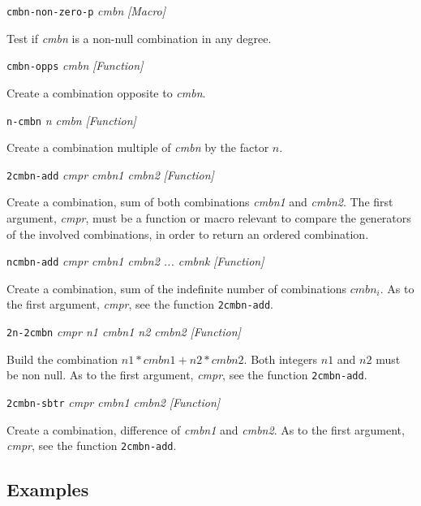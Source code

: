 {{\leftskip=5mm 
{\tt cmbn-non-zero-p} {\em cmbn} \hfill {\em [Macro]} \par}
{\leftskip=15mm 
Test if {\em cmbn} is a non-null combination in any degree. \par}
{\leftskip=5mm 
{\tt cmbn-opps} {\em cmbn} \hfill {\em [Function]} \par}
{\leftskip=15mm 
Create a  combination opposite to {\em cmbn}. \par}
{\leftskip=5mm 
{\tt n-cmbn} {\em n cmbn} \hfill {\em [Function]} \par}
{\leftskip=15mm 
Create a  combination multiple of  {\em cmbn} by the factor $n$. \par}
{\leftskip=5mm 
{\tt 2cmbn-add} {\em cmpr cmbn1 cmbn2} \hfill {\em [Function]} \par}
{\leftskip=15mm 
Create a combination, sum of both combinations {\em cmbn1} and {\em cmbn2}. The first
argument, {\em cmpr}, must be a function or macro relevant to compare the generators of the
involved combinations, in order to return an ordered combination. \par}
}
\newpage
{\parindent=0mm
{\leftskip=5mm 
{\tt ncmbn-add} {\em cmpr cmbn1 cmbn2 ... cmbnk} \hfill {\em [Function]} \par}
{\leftskip=15mm 
Create a combination, sum of the indefinite number of combinations $cmbn_i$. As to the first
argument, {\em cmpr}, see the function {\tt 2cmbn-add}. \par}
{\leftskip=5mm 
{\tt 2n-2cmbn} {\em cmpr n1 cmbn1 n2 cmbn2} \hfill {\em [Function]} \par}
{\leftskip=15mm 
Build the combination $n1 * cmbn1 + n2 * cmbn2$. Both integers $n1$ and $n2$ must be
non null. As to the first argument, {\em cmpr}, see the function {\tt 2cmbn-add}. \par}
{\leftskip=5mm 
{\tt 2cmbn-sbtr} {\em cmpr cmbn1 cmbn2} \hfill {\em [Function]} \par}
{\leftskip=15mm 
Create a combination, difference of {\em cmbn1} and {\em cmbn2}. 
As to the first argument, {\em cmpr}, see the function {\tt 2cmbn-add}. \par}
}
\subsection* {Examples}

